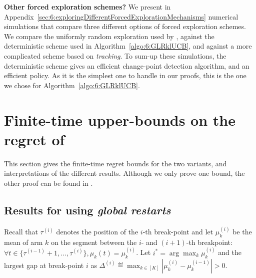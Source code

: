 \textbf{Other forced exploration schemes?}
%
We present in Appendix~\ref{sec:6:exploringDifferentForcedExplorationMechanisms} numerical simulations that compare three different options of forced exploration schemes.
We compare the uniformly random exploration used by \CUSUMUCB, against the deterministic scheme used in Algorithm~\ref{algo:6:GLRklUCB}, and against a more complicated scheme based on \emph{tracking}.
To sum-up these simulations, the deterministic scheme gives an efficient change-point detection algorithm, and an efficient \GLRklUCB{} policy.
As it is the simplest one to handle in our proofs, this is the one we chose for Algorithm~\ref{algo:6:GLRklUCB}.



\section{Finite-time upper-bounds on the regret of \GLRklUCB}
\label{sec:6:RegretAnalysis}

This section gives the finite-time regret bounds for the two variants, and interpretations of the different results.
Although we only prove one bound, the other proof can be found in \cite{Besson2019GLRT}.

\subsection{Results for \GLRklUCB{} using \emph{global restarts}}

Recall that $\tau^{(i)}$ denotes the position of the $i$-th break-point and let $\mu_k^{(i)}$ be the mean of arm $k$ on the segment between the $i$- and $(i+1)$-th breakpoint:
$\forall t \in \{ \tau^{(i-1)}+1, \dots, \tau^{(i)} \}, \mu_k(t) = \mu_k^{(i)}$.
Let $i^* = \arg\max_k \mu_k^{(i)} $ and the largest gap at break-point $i$ as $\Delta^{(i)} \eqdef \max_{k\in[K]} |\mu_k^{(i)} - \mu_k^{(i-1)}| >0$.


